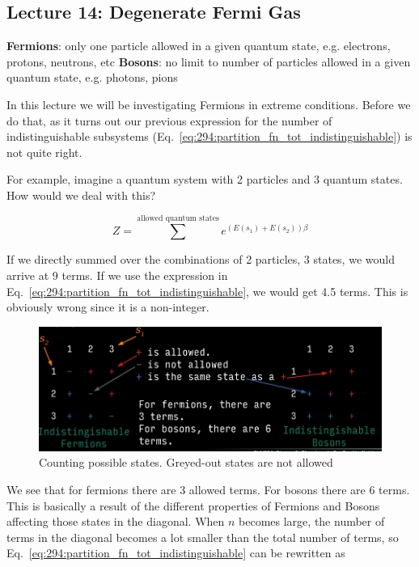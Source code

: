 \documentclass[10pt]{article}
\begin{document}
\subsection{Lecture 14: Degenerate Fermi Gas}

\begin{definition}
	\textbf{Fermions}: only one particle allowed in a given quantum state, e.g. electrons, protons, neutrons, etc
	\textbf{Bosons}: no limit to number of particles allowed in a given quantum state, e.g. photons, pions
\end{definition}

In this lecture we will be investigating Fermions in extreme conditions.
Before we do that, as it turns out our previous expression for the number of indistinguishable subsystems (Eq.~\ref{eq:294:partition_fn_tot_indistinguishable}) is not quite right.


For example, imagine a quantum system with 2 particles and 3 quantum states. 
How would we deal with this?

\begin{equation}
	Z = \sum^\text{allowed quantum states}  e^{(E(s_1) + E(s_2))\beta}
\end{equation}

If we directly summed over the combinations of 2 particles, 3 states, we would arrive at 9 terms.
If we use the expression in Eq.~\ref{eq:294:partition_fn_tot_indistinguishable}, we would get 4.5 terms. 
This is obviously wrong since it is a non-integer.

\begin{figure}[H]
	\centering
	\includegraphics[width=0.8\linewidth]{img/294_counting_bos_ferm.png}
	\caption{Counting possible states. Greyed-out states are not allowed}
\end{figure}

We see that for fermions there are 3 allowed terms. 
For bosons there are 6 terms. This is basically a result of the different properties of Fermions and Bosons affecting those states in the diagonal.
When $ n $ becomes large, the number of terms in the diagonal becomes a lot smaller than the total number of terms, so Eq.~\ref{eq:294:partition_fn_tot_indistinguishable} can be rewritten as 
\end{document}
